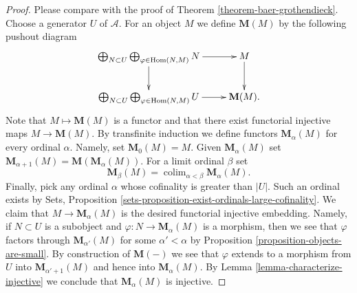\documentclass[10pt,a4paper]{amsart}
\theoremstyle{plain}
\theoremstyle{definition}
\theoremstyle{remark}
\numberwithin{equation}{subsection}
\def\colim{\mathop{\mathrm{colim}}\nolimits}
\def\Hom{\mathop{\mathrm{Hom}}\nolimits}
\begin{document}
\begin{proof}
Please compare with the proof of
Theorem \ref{theorem-baer-grothendieck}.
Choose a generator $U$ of $\mathcal{A}$. For an object $M$ we define
$\mathbf{M}(M)$ by the following pushout diagram
$$
\xymatrix{
\bigoplus_{N \subset U}
\bigoplus_{\varphi \in \Hom(N, M)}
N \ar[r] \ar[d] & M \ar[d] \\
\bigoplus_{N \subset U}
\bigoplus_{\varphi \in \Hom(N, M)}
U \ar[r] &  \mathbf{M}(M).
}
$$
Note that $M \mapsto \mathbf{M}(M)$ is a functor and that there
exist functorial injective maps $M \to \mathbf{M}(M)$. By transfinite
induction we define functors $\mathbf{M}_\alpha(M)$ for every
ordinal $\alpha$. Namely, set $\mathbf{M}_0(M) = M$. Given
$\mathbf{M}_\alpha(M)$ set
$\mathbf{M}_{\alpha + 1}(M) = \mathbf{M}(\mathbf{M}_\alpha(M))$.
For a limit ordinal $\beta$ set
$$
\mathbf{M}_\beta(M) = \colim_{\alpha < \beta} \mathbf{M}_\alpha(M).
$$
Finally, pick any ordinal $\alpha$ whose cofinality is greater than $|U|$.
Such an ordinal exists by
Sets, Proposition \ref{sets-proposition-exist-ordinals-large-cofinality}.
We claim that $M \to \mathbf{M}_\alpha(M)$ is the desired functorial
injective embedding. Namely, if $N \subset U$ is a subobject and
$\varphi : N \to \mathbf{M}_\alpha(M)$ is a morphism, then we see that
$\varphi$ factors through $\mathbf{M}_{\alpha'}(M)$ for some
$\alpha' < \alpha$ by
Proposition \ref{proposition-objects-are-small}.
By construction of $\mathbf{M}(-)$ we see that $\varphi$ extends to
a morphism from $U$ into $\mathbf{M}_{\alpha' + 1}(M)$ and hence into
$\mathbf{M}_\alpha(M)$. By
Lemma \ref{lemma-characterize-injective}
we conclude that $\mathbf{M}_\alpha(M)$ is injective.
\end{proof}
\end{document}
